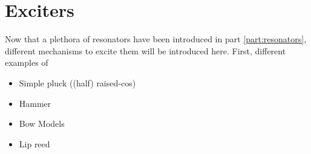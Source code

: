 \chapter*{Exciters}
Now that a plethora of resonators have been introduced in part \ref{part:resonators}, different mechanisms to excite them will be introduced here. First, different examples of 

\begin{itemize}
    \item Simple pluck ((half) raised-cos)
    \item Hammer
    \item Bow Models
    \item Lip reed
\end{itemize}